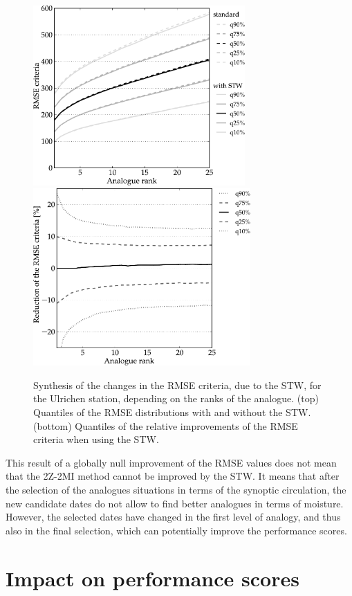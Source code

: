 \documentclass[hess]{copernicus}
\begin{document}
\begin{figure}[htb]
	\begin{center}
		\includegraphics[width=8.1cm]{figures/changes_RMSE_value.pdf} \\
		\includegraphics[width=8.3cm]{figures/changes_RMSE_gain.pdf}
	\end{center}
	\caption{Synthesis of the changes in the RMSE criteria, due to the STW, for the Ulrichen station, depending on the ranks of the analogue. (top) Quantiles of the RMSE distributions with and without the STW. (bottom) Quantiles of the relative improvements of the RMSE criteria when using the STW.}
	\label{fig:changes_RMSE}
\end{figure}

This result of a globally null improvement of the RMSE values does not mean that the 2Z-2MI method cannot be improved by the STW. It means that after the selection of the analogues situations in terms of the synoptic circulation, the new candidate dates do not allow to find better analogues in terms of moisture. However, the selected dates have changed in the first level of analogy, and thus also in the final selection, which can potentially improve the performance scores.


\section{Impact on performance scores}
\end{document}
